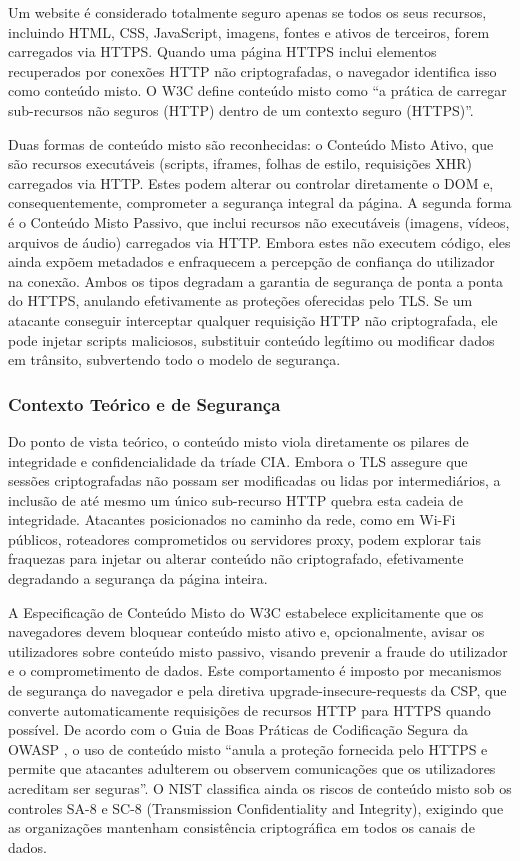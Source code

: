 Um website é considerado totalmente seguro apenas se todos os seus recursos, incluindo HTML, CSS, JavaScript, imagens, fontes e ativos de terceiros, forem carregados via HTTPS. Quando uma página HTTPS inclui elementos recuperados por conexões HTTP não criptografadas, o navegador identifica isso como conteúdo misto. O W3C define conteúdo misto como “a prática de carregar sub-recursos não seguros (HTTP) dentro de um contexto seguro (HTTPS)”. \cite{ref50}

Duas formas de conteúdo misto são reconhecidas: o Conteúdo Misto Ativo, que são recursos executáveis (scripts, iframes, folhas de estilo, requisições XHR) carregados via HTTP. Estes podem alterar ou controlar diretamente o DOM e, consequentemente, comprometer a segurança integral da página. A segunda forma é o Conteúdo Misto Passivo, que inclui recursos não executáveis (imagens, vídeos, arquivos de áudio) carregados via HTTP. Embora estes não executem código, eles ainda expõem metadados e enfraquecem a percepção de confiança do utilizador na conexão. Ambos os tipos degradam a garantia de segurança de ponta a ponta do HTTPS, anulando efetivamente as proteções oferecidas pelo TLS. Se um atacante conseguir interceptar qualquer requisição HTTP não criptografada, ele pode injetar scripts maliciosos, substituir conteúdo legítimo ou modificar dados em trânsito, subvertendo todo o modelo de segurança. \cite{ref49}

\subsubsection{Contexto Teórico e de Segurança}
\label{subsubsec:contexto-teorico-MC}

Do ponto de vista teórico, o conteúdo misto viola diretamente os pilares de integridade e confidencialidade da tríade CIA. Embora o TLS assegure que sessões criptografadas não possam ser modificadas ou lidas por intermediários, a inclusão de até mesmo um único sub-recurso HTTP quebra esta cadeia de integridade. Atacantes posicionados no caminho da rede, como em Wi-Fi públicos, roteadores comprometidos ou servidores proxy, podem explorar tais fraquezas para injetar ou alterar conteúdo não criptografado, efetivamente degradando a segurança da página inteira. 

A Especificação de Conteúdo Misto do W3C \cite{ref50} estabelece explicitamente que os navegadores devem bloquear conteúdo misto ativo e, opcionalmente, avisar os utilizadores sobre conteúdo misto passivo, visando prevenir a fraude do utilizador e o comprometimento de dados. Este comportamento é imposto por mecanismos de segurança do navegador e pela diretiva upgrade-insecure-requests da CSP, que converte automaticamente requisições de recursos HTTP para HTTPS quando possível. De acordo com o Guia de Boas Práticas de Codificação Segura da OWASP \cite{ref51}, o uso de conteúdo misto “anula a proteção fornecida pelo HTTPS e permite que atacantes adulterem ou observem comunicações que os utilizadores acreditam ser seguras”. O NIST \cite{ref8} classifica ainda os riscos de conteúdo misto sob os controles SA-8 e SC-8 (Transmission Confidentiality and Integrity), exigindo que as organizações mantenham consistência criptográfica em todos os canais de dados. 

